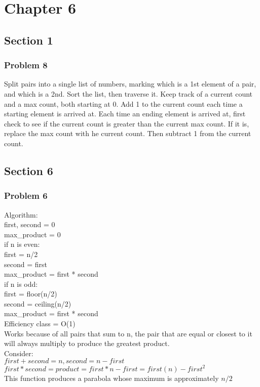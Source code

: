 \documentclass{article}
\newcommand\ttab[0]{\tabto{5mm}}
\begin{document}
  \section{Chapter 6}
    \subsection{Section 1}
      \subsubsection{Problem 8}
        Split pairs into a single list of numbers, marking which is a 1st element of a pair, and which is a 2nd. Sort the list, then traverse it.  Keep track of a current count and a max count, both starting at 0. Add 1 to the current count each time a starting element is arrived at. Each time an ending element is arrived at, first check to see if the current count is greater than the current max count. If it is, replace the max count with he current count. Then subtract 1 from the current count.

    \subsection{Section 6}
      \subsubsection{Problem 6}
        Algorithm: \\
          first, second = 0 \\
          max\_product = 0 \\
          if n is even:\\
          \ttab  first = n/2 \\
          \ttab  second = first\\
          \ttab  max\_product = first * second\\
          if n is odd:\\
            \ttab first = floor(n/2) \\
            \ttab second = ceiling(n/2) \\
            \ttab max\_product = first * second \\

      Efficiency class = O(1) \\
      Works because of all pairs that sum to n, the pair that are equal or closest
      to it will always multiply to produce the greatest product.\\
      Consider:\\
      \ttab  $first + second = n, second=n-first$
      \ttab  $first * second = product = first * n-first = first(n) - first^2$\\
      This function produces a parabola whose maximum is approximately $n/2$
\end{document}
